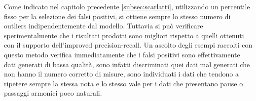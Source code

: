 Come indicato nel capitolo precedente \ref{subsec:scarlatti}, utilizzando un percentile fisso per la selezione dei falsi positivi, si ottiene sempre lo stesso numero di outliers indipendentemente dal modello. Tuttavia si può verificare sperimentalmente che i risultati prodotti sono migliori rispetto a quelli ottenuti con il supporto dell'improved precision-recall. 
Un ascolto degli esempi raccolti con questo metodo verifica immediatamente che i falsi positivi sono effettivamente dati generati di bassa qualità, sono infatti discriminati quei dati mal generati che non hanno il numero corretto di misure, sono individuati i dati che tendono a ripetere sempre la stessa nota e lo stesso vale per i dati che presentano pause o passaggi armonici poco naturali.

